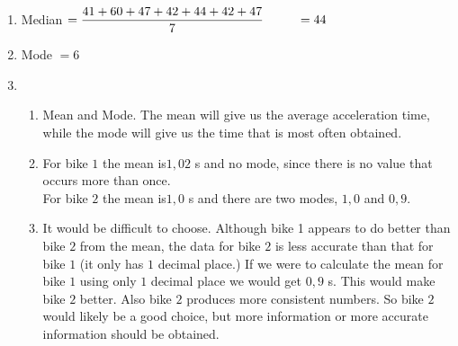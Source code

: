  \begin{solutions}{}{
\begin{enumerate}[itemsep=5pt, label=\textbf{\arabic*}. ] 


\item %
Median $=\dfrac{41+60+47+42+44+42+47}{7} \\
~~~~~~~~=44\\$
\item %
Mode $=6$
\item %

\begin{enumerate}[noitemsep, label=\textbf{(\alph*)} ]
    \item Mean and Mode. The mean will give us the average acceleration time, while the mode will give us the time that is most often obtained.%
    \item For bike $1$ the mean is$1,02$ s and no mode, since there is no value that occurs more than once.\\
	  For bike $2$ the mean is$1,0$ s and there are two modes, $1,0$ and $0,9$.
    \item It would be difficult to choose. Although bike 1 appears to do better than bike $2$ from the mean, the data for bike $2$ is less accurate than that for bike $1$ (it only has $1$ decimal place.) If we were to calculate the mean for bike $1$ using only $1$ decimal place we would get $0,9$ s. This would make bike $2$ better. Also bike $2$ produces more consistent numbers. So bike $2$ would likely be a good choice, but more information or more accurate information should be obtained.

    \end{enumerate}


\end{enumerate}}
\end{solutions}
